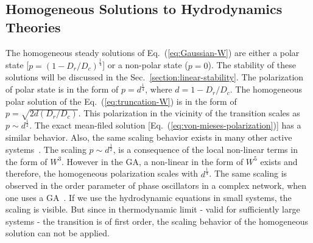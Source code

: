\documentclass[reprint,floatfix,amsmath,amssymb,aps,pre,showkeys,showpacs,superscriptaddress]{revtex4-1}
\newcommand{\p}{p}
\newcommand{\w}{W}
\newcommand{\req}[1]{Eq.~(\ref{#1})}
\begin{document}
\subsection{Homogeneous Solutions to Hydrodynamics Theories}
\label{subsec:homogeneous}

The homogeneous steady solutions of \req{eq:Gaussian-W} are either a polar state [$\p = (1 - D_r / D_c)^\frac{1}{4}$] or a non-polar state ($\p = 0$). The stability of these solutions will be discussed in the Sec.~\ref{section:linear-stability}. The polarization of polar state is in the form of $\p = d^\frac{1}{4}$, where $d = 1 - D_r/D_c$. The homogeneous polar solution of the \req{eq:truncation-W} is in the form of $\p=\sqrt{ 2 d (D_r / D_c)}$. This polarization in the vicinity of the transition scales as $\p \sim d^{\frac{1}{2}}$. The exact mean-filed solution [\req{eq:von-mieses-polarization}] has a similar behavior. Also, the same scaling behavior exists in many other active systems~\cite{Toner1995,Bertin2006,Bertin2009,Farrell2012,Bertin2006,Bertin2009,peruani2008mean}. The scaling $\p \sim d^{\frac{1}{2}}$, is a consequence of the local non-linear terms in the form of $\w^3$. However in the GA, a non-linear in the form of $\w^5$ exists and therefore, the homogeneous polarization scales with $d^{\frac{1}{4}}$. The same scaling is observed in the order parameter of phase oscillators in a complex network, when one uses a GA~\cite{sonnenschein2013approximate,sonnenschein2013excitable,sonnenschein2014cooperative,Sonnenschein2015}. If we use the hydrodynamic equations in small systems, the scaling is visible. But since in thermodynamic limit - valid for sufficiently large systems - the transition is of first order, the scaling behavior of the homogeneous solution can not be applied.
\end{document}
